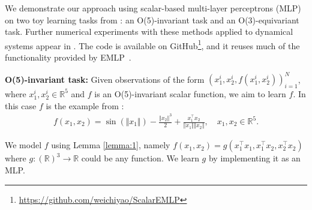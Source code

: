 \documentclass{article}
\renewcommand{\paragraph}[1]{\par\textbf{#1}}
\theoremstyle{Hogg}
\begin{document}
\label{sec.numerical}
We demonstrate our approach using scalar-based multi-layer perceptrons (MLP) on two toy learning tasks from \cite{finzi2021practical}: an O(5)-invariant task and an O(3)-equivariant task. Further numerical experiments with these methods applied to dynamical systems appear in \cite{yao2021simple}. The code is available on GitHub\footnote{\url{https://github.com/weichiyao/ScalarEMLP}}, and it reuses much of the functionality provided by EMLP~\cite{finzi2021practical}.

\paragraph{O(5)-invariant task:}
Given observations of the form $(x_1^i, x_2^i, f(x_1^i, x_2^i))_{i=1}^N$, where $x_1^i,x_2^i \in \mathbb R^5$ and  $f$ is an O(5)-invariant scalar function, we aim to learn $f$. In this case $f$ is the example from \cite{finzi2021practical}:
\begin{align}f(x_1,x_2) = \sin(\Vert x_1\Vert)-\frac{\Vert x_2\Vert^3}{2}+\frac{x_1^\top x_2}{\Vert x_1\Vert\Vert x_2\Vert}, \quad x_1,x_2\in\mathbb{R}^5.
\end{align}

We model $f$ using Lemma \ref{lemma:1}, namely 
$f(x_1,x_2) = g(x_1^\top x_1, x_1^\top x_2, x_2^\top x_2)$
where $g:(\mathbb R)^3\to \mathbb R$ could be any function. We learn $g$ by implementing it as an MLP.
\end{document}
